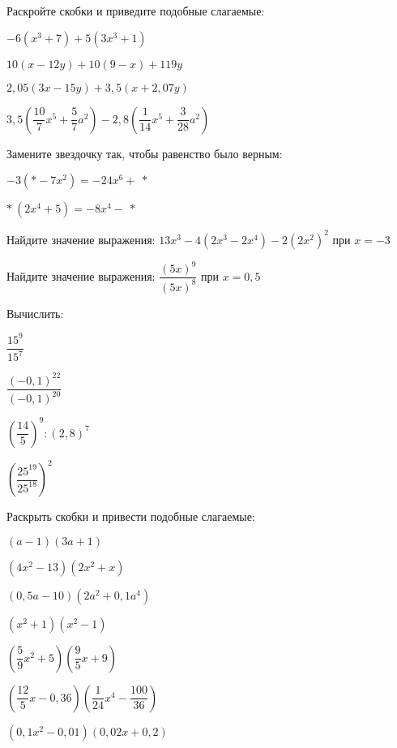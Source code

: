 %
%
\begin{homework}[number=1]
	\begin{listofex}
		\item Раскройте скобки и приведите подобные слагаемые:
		\begin{enumcols}[itemcolumns=2]
			\item \( -6(x^3+7)+5(3x^3+1) \)
			\item \( 10(x-12y)+10(9-x)+119y \)
			\item \( 2,05(3x-15y)+3,5(x+2,07y) \)
			\item \( 3,5\left( \dfrac{10}{7}x^5+\dfrac{5}{7}a^2 \right)-2,8\left( \dfrac{1}{14}x^5+\dfrac{3}{28}a^2 \right) \)
		\end{enumcols}
		\item Замените звездочку так, чтобы равенство было верным:
		\begin{enumcols}[itemcolumns=2]
			\item \( -3(*-7x^2)=-24x^6+\:* \)
			\item \( *\:(2x^4+5)=-8x^4-\:* \)
		\end{enumcols}
		\item Найдите значение выражения: \( 13x^3-4(2x^3-2x^4)-2(2x^2)^2 \) при \( x=-3 \)
		\item Найдите значение выражения: \( \dfrac{(5x)^9}{(5x)^8} \) при \( x=0,5 \)
		\item Вычислить:
		\begin{enumcols}[itemcolumns=4]
			\item \( \dfrac{15^9}{15^7} \)
			\item \( \dfrac{(-0,1)^{22}}{(-0,1)^{20}} \)
			\item \( \left( \dfrac{14}{5} \right)^{9}:\left( 2,8 \right)^{7} \)
			\item \( \left( \dfrac{25^{19}}{25^{18}} \right)^2 \)
		\end{enumcols}
		\item Раскрыть скобки и привести подобные слагаемые:
		\begin{enumcols}[itemcolumns=3]
			\item \( (a-1)(3a+1) \)
			\item \( (4x^2-13)(2x^2+x) \)
			\item \( (0,5a-10)(2a^2+0,1a^4) \)
			\item \( (x^2+1)(x^2-1) \)
			\item \( \left( \dfrac{5}{9}x^2+5 \right)\left( \dfrac{9}{5}x+9 \right) \)
			\item \( \left( \dfrac{12}{5}x-0,36 \right)\left( \dfrac{1}{24}x^4-\dfrac{100}{36} \right) \)
			\item \( (0,1x^2-0,01)(0,02x+0,2) \)
		\end{enumcols}
	\end{listofex}
\end{homework}
